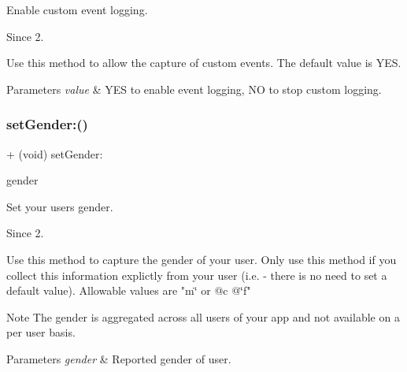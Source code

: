 Enable custom event logging. 

\begin{DoxySince}{Since}
2.
\end{DoxySince}
Use this method to allow the capture of custom events. The default value is {\ttfamily Y\+ES}.


\begin{DoxyParams}{Parameters}
{\em value} & Y\+ES to enable event logging, NO to stop custom logging. \\
\hline
\end{DoxyParams}
\mbox{\label{interfaceFlurry_a40c368f4ef3784467f9ba170c37c174f}} 
\subsubsection{\texorpdfstring{set\+Gender\+:()}{setGender:()}}
{\footnotesize\ttfamily + (void) set\+Gender\+: \begin{DoxyParamCaption}\item[{(N\+S\+String $\ast$)}]{gender }\end{DoxyParamCaption}}



Set your user\textquotesingle{}s gender. 

\begin{DoxySince}{Since}
2.
\end{DoxySince}
Use this method to capture the gender of your user. Only use this method if you collect this information explictly from your user (i.\+e. -\/ there is no need to set a default value). Allowable values are {\ttfamily "m\char`\"{} or @c @\char`\"{}f"} 

\begin{DoxyNote}{Note}
The gender is aggregated across all users of your app and not available on a per user basis.
\end{DoxyNote}

\begin{DoxyParams}{Parameters}
{\em gender} & Reported gender of user. \\
\hline
\end{DoxyParams}
\mbox{\label{interfaceFlurry_a2cbbad5344ba6f6c8d43daede566e0cc}} 

